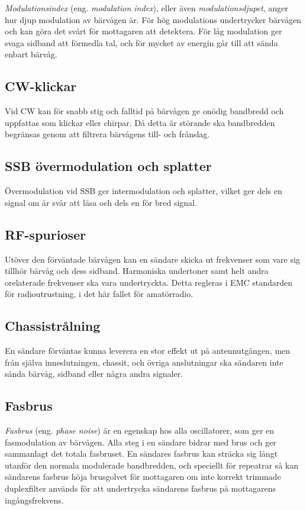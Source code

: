 \emph{Modulationsindex} (eng. \emph{modulation index}), eller även
\emph{modulationsdjupet}, anger hur djup modulation av bärvågen är.
För hög modulations undertrycker bärvågen och kan göra det svårt för
mottagaren att detektera.
För låg modulation ger svaga sidband att förmedla tal, och för mycket
av energin går till att sända enbart bärvåg.

\subsection{CW-klickar}

Vid CW kan för snabb stig och falltid på bärvågen ge onödig bandbredd och
uppfattas som klickar eller chirpar. Då detta är störande ska bandbredden
begränsas genom att filtrera bärvågens till- och frånslag.

\subsection{SSB övermodulation och splatter}

Övermodulation vid SSB ger intermodulation och splatter, vilket ger dels en
signal om är svår att läsa och dels en för bred signal.

\subsection{RF-spurioser}

Utöver den förväntade bärvågen kan en sändare skicka ut frekvenser som vare
sig tillhör bärvåg och dess sidband. Harmoniska undertoner samt helt andra
orelaterade frekvenser ska vara undertryckta.
Detta regleras i EMC standarden för radioutrustning, i det här fallet för
amatörradio.

\subsection{Chassistrålning}

En sändare förväntas kunna leverera en stor effekt ut på antennutgången, men
från själva inneslutningen, chassit, och övriga anslutningar ska sändaren
inte sända bärvåg, sidband eller några andra signaler.

\subsection{Fasbrus}

\emph{Fasbrus} (eng. \emph{phase noise}) är en egenskap hos alla oscillatorer,
som ger en fasmodulation av bärvågen.
Alla steg i en sändare bidrar med brus och ger sammanlagt det totala fasbruset.
En sändares fasbrus kan sträcka sig långt utanför den normala modulerade
bandbredden, och speciellt för repeatrar så kan sändarens fasbrus höja
brusgolvet för mottagaren om inte korrekt trimmade duplexfilter
används för att undertrycka sändarens fasbrus på mottagarens ingångsfrekvens.
